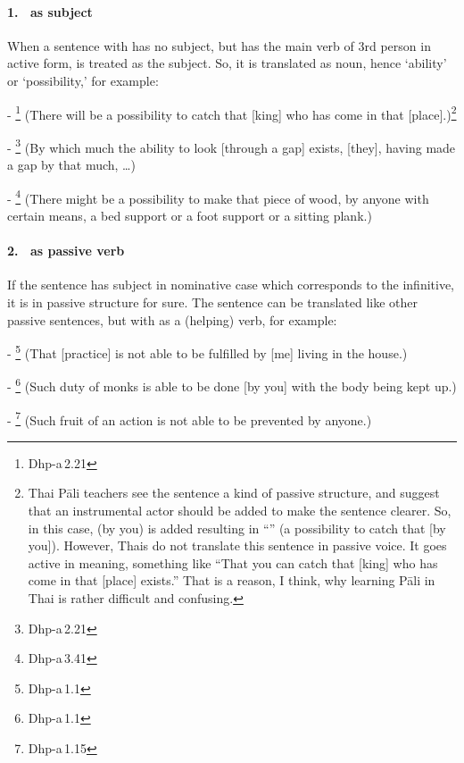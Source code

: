 \paragraph*{1.\  as subject} When a sentence with  has no subject, but has the main verb of 3rd person in active form,  is treated as the subject. So, it is translated as noun, hence `ability' or `possibility,' for example:\par
- \footnote{Dhp-a\,2.21} (There will be a possibility to catch that [king] who has come in that [place].)\footnote{Thai P\=ali teachers see the sentence a kind of passive structure, and suggest that an instrumental actor should be added to make the sentence clearer. So, in this case,  (by you) is added resulting in ``'' (a possibility to catch that [by you]). However, Thais do not translate this sentence in passive voice. It goes active in meaning, something like ``That you can catch that [king] who has come in that [place] exists.'' That is a reason, I think, why learning P\=ali in Thai is rather difficult and confusing.}\par
- \footnote{Dhp-a\,2.21} (By which much the ability to look [through a gap] exists, [they], having made a gap by that much, \ldots)\par
- \footnote{Dhp-a\,3.41} (There might be a possibility to make that piece of wood, by anyone with certain means, a bed support or a foot support or a sitting plank.)\par

\paragraph*{2.\  as passive verb} If the sentence has subject in nominative case which corresponds to the infinitive, it is in passive structure for sure. The sentence can be translated like other passive sentences, but with  as a (helping) verb, for example:\par
- \footnote{Dhp-a\,1.1} (That [practice] is not able to be fulfilled by [me] living in the house.)\par
- \footnote{Dhp-a\,1.1} (Such duty of monks is able to be done [by you] with the body being kept up.)\par
- \footnote{Dhp-a\,1.15} (Such fruit of an action is not able to be prevented by anyone.)\par

